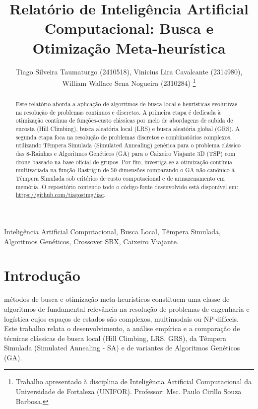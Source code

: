\documentclass[journal,onecolumn]{IEEEtran}
\begin{document}
\title{Relatório de Inteligência Artificial Computacional: Busca e Otimização Meta-heurística}

\author{Tiago Silveira Taumaturgo (2410518),
        Vinicius Lira Cavalcante (2314980), \\
        William Wallace Sena Nogueira (2310284)
\thanks{Trabalho apresentado à disciplina de Inteligência Artificial Computacional da Universidade de Fortaleza (UNIFOR). Professor: Msc. Paulo Cirillo Souza Barbosa.}}

\maketitle

\begin{abstract}
Este relatório aborda a aplicação de algoritmos de busca local e heurísticas evolutivas na resolução de problemas contínuos e discretos. A primeira etapa é dedicada à otimização contínua de funções-custo clássicas por meio de abordagens de subida de encosta (Hill Climbing), busca aleatória local (LRS) e busca aleatória global (GRS). A segunda etapa foca na resolução de problemas discretos e combinatórios complexos, utilizando Têmpera Simulada (Simulated Annealing) genérica para o problema clássico das 8-Rainhas e Algoritmos Genéticos (GA) para o Caixeiro Viajante 3D (TSP) com drone baseado na base oficial de grupos. Por fim, investiga-se a otimização contínua multivariada na função Rastrigin de 50 dimensões comparando o GA não-canônico à Têmpera Simulada sob critérios de custo computacional e de armazenamento em memória. O repositório contendo todo o código-fonte desenvolvido está disponível em: \href{https://github.com/tiagostmg/iac}{https://github.com/tiagostmg/iac}.
\end{abstract}

\begin{IEEEkeywords}
Inteligência Artificial Computacional, Busca Local, Têmpera Simulada, Algoritmos Genéticos, Crossover SBX, Caixeiro Viajante.
\end{IEEEkeywords}

\section{Introdução}
 métodos de busca e otimização meta-heurísticos constituem uma classe de algoritmos de fundamental relevância na resolução de problemas de engenharia e logística cujos espaços de estados são complexos, multimodais ou NP-difíceis. Este trabalho relata o desenvolvimento, a análise empírica e a comparação de técnicas clássicas de busca local (Hill Climbing, LRS, GRS), da Têmpera Simulada (Simulated Annealing - SA) e de variantes de Algoritmos Genéticos (GA).
\end{document}
